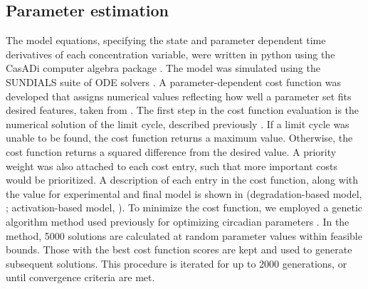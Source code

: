 \subsection{Parameter estimation}\label{sec:parameter}
The model equations, specifying the state and parameter dependent time derivatives of each concentration variable, were written in python using the CasADi computer algebra package \cite{Andersson2010}. 
The model was simulated using the SUNDIALS suite of ODE solvers \cite{Hindmarsh2005}. 
A parameter-dependent cost function was developed that assigns numerical values reflecting how well a parameter set fits desired features, taken from \cite{Lee2001}. 
The first step in the cost function evaluation is the numerical solution of the limit cycle, described previously \cite{Wilkins2009}. 
If a limit cycle was unable to be found, the cost function returns a maximum value. 
Otherwise, the cost function returns a squared difference from the desired value. 
A priority weight was also attached to each cost entry, such that more important costs would be prioritized. 
A description of each entry in the cost function, along with the value for experimental and final model is shown in  (degradation-based model, ; activation-based model, ). 
To minimize the cost function, we employed a genetic algorithm method used previously for optimizing circadian parameters \cite{Mirsky2009}. 
In the method, 5000 solutions are calculated at random parameter values within feasible bounds. 
Those with the best cost function scores are kept and used to generate subsequent solutions. 
This procedure is iterated for up to 2000 generations, or until convergence criteria are met.

